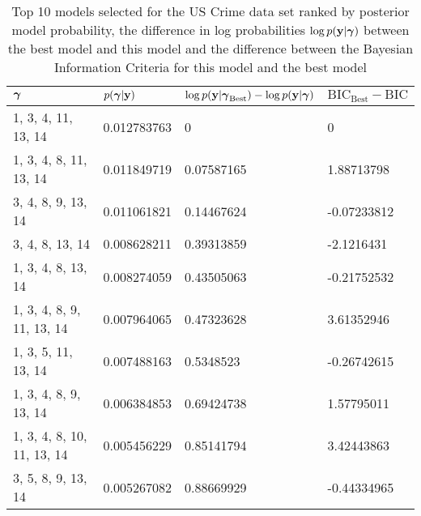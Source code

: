 \documentclass{amsart}
\begin{document}
\begin{table}
\label{tab:numerical_results_uscrime}
\caption{Top 10 models selected for the US Crime data set ranked by posterior model probability, the
					difference in log probabilities $\log p({\bf y}|{\boldsymbol \gamma})$ between the best model and this model and the difference between the Bayesian Information Criteria for this model and the best model}
\begin{tabular}{|l|lll|}
\hline
${\boldsymbol \gamma}$ & $p({\boldsymbol \gamma}|{\bf y})$ & $\log p({\bf y} | {\boldsymbol \gamma}_\text{Best}) - \log p({\bf y} | {\boldsymbol \gamma})$ & $\text{BIC}_\text{Best} - \text{BIC}$ \\
\hline
1, 3, 4, 11, 13, 14 & 0.012783763 & 0 & 0 \\
1, 3, 4, 8, 11, 13, 14 & 0.011849719 & 0.07587165 & 1.88713798 \\
3, 4, 8, 9, 13, 14 & 0.011061821 & 0.14467624 & -0.07233812 \\
3, 4, 8, 13, 14 & 0.008628211 & 0.39313859 & -2.1216431 \\
1, 3, 4, 8, 13, 14 & 0.008274059 & 0.43505063 & -0.21752532 \\
1, 3, 4, 8, 9, 11, 13, 14 & 0.007964065 & 0.47323628 & 3.61352946 \\
1, 3, 5, 11, 13, 14 & 0.007488163 & 0.5348523 & -0.26742615 \\
1, 3, 4, 8, 9, 13, 14 & 0.006384853 & 0.69424738 & 1.57795011 \\
1, 3, 4, 8, 10, 11, 13, 14 & 0.005456229 & 0.85141794 & 3.42443863 \\
3, 5, 8, 9, 13, 14 & 0.005267082 & 0.88669929 & -0.44334965 \\
\hline
\end{tabular}
\end{table}
\end{document}
